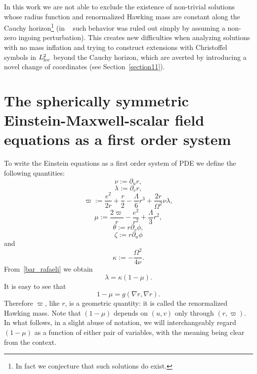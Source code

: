 \documentclass[a4paper,11pt,oneside,reqno]{amsart}
\newcommand{\truemu}{\frac{2\varpi}{r}-\frac{e^2}{r^2}+\frac{\Lambda}{3}r^2}
\begin{document}
In this work we are not able to exclude the existence of non-trivial solutions whose radius function and renormalized Hawking mass are constant along the Cauchy horizon\footnote{In fact we conjecture that such solutions do exist.} (in ~\cite{relIst2, relIst3} such behavior was ruled out simply by assuming a non-zero ingoing perturbation). This creates new difficulties when analyzing solutions with no mass inflation and trying to construct extensions with Christoffel symbols in $L^2_{{\rm loc}}$ beyond the Cauchy horizon, which are averted by introducing a novel change of coordinates (see Section~\ref{section11}).   

\section{The spherically symmetric Einstein-Maxwell-scalar field \newline equations as a first order system}

To write the Einstein equations as a first order system of PDE we define the following quantities:
\begin{equation}\label{nu_0}
\nu:=\partial_u r,
\end{equation}
\begin{equation}\label{lambda_0}
\lambda:=\partial_v r,
\end{equation}
\begin{equation}\label{bar_rafaeli} 
\varpi:=\frac{e^2}{2r}+\frac{r}{2}-\frac{\Lambda}{6}r^3+\frac{2r}{\Omega^2}\nu\lambda,
\end{equation}
\begin{equation}\label{mu} 
\mu:=\truemu,
\end{equation}
\begin{equation}\label{theta} 
\theta:=r\partial_v\phi,
\end{equation}
\begin{equation}\label{zeta} 
\zeta:=r\partial_u\phi
\end{equation}
and
\begin{equation}\label{kappa_0} 
 \kappa:=-\frac{\Omega^2}{4\nu}.
\end{equation}
From~\eqref{bar_rafaeli} we obtain
\begin{equation}
 \lambda = \kappa (1-\mu).
\end{equation}
It is easy to see that
\[
1-\mu = g(\nabla r,\nabla r). 
\]
Therefore $\varpi$, like $r$, is a geometric quantity: it is called the renormalized Hawking mass.
Note that $(1-\mu)$ depends on $(u,v)$ only through $(r,\varpi)$. In what follows, in a slight abuse of notation, we will interchangeably regard $(1-\mu)$ as a function of either pair of variables, with the meaning being clear from the context.
\end{document}
